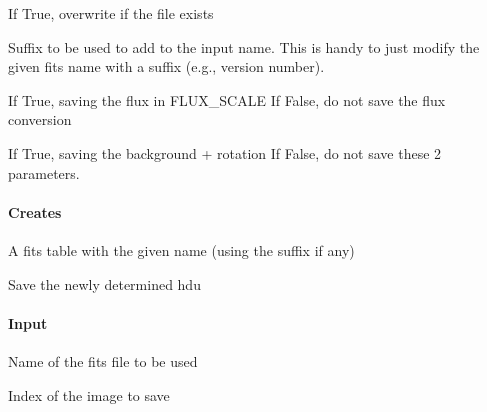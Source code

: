 \documentclass[letterpaper,10pt,english]{sphinxmanual}
\begin{document}
\begin{fulllineitems}
\begin{fulllineitems}
\begin{description}
\sphinxAtStartPar
If True, overwrite if the file exists

\sphinxAtStartPar
Suffix to be used to add to the input name. This is handy
to just modify the given fits name with a suffix
(e.g., version number).

\sphinxAtStartPar
If True, saving the flux in FLUX\_SCALE
If False, do not save the flux conversion

\sphinxAtStartPar
If True, saving the background + rotation
If False, do not save these 2 parameters.

\end{description}


\paragraph{Creates}
\label{\detokenize{api/pymusepipe:id26}}
\sphinxAtStartPar
A fits table with the given name (using the suffix if any)

\end{fulllineitems}


\begin{fulllineitems}
\label{\detokenize{api/pymusepipe:pymusepipe.align_pipe.AlignMuseDataset.save_image}}
\pysigstartsignatures
{}
\pysigstopsignatures
\sphinxAtStartPar
Save the newly determined hdu


\paragraph{Input}
\label{\detokenize{api/pymusepipe:id27}}\begin{description}
\sphinxAtStartPar
Name of the fits file to be used

\sphinxAtStartPar
Index of the image to save

\end{description}



\end{fulllineitems}
\end{fulllineitems}
\end{document}
